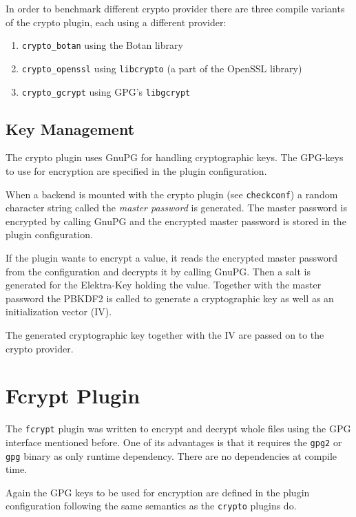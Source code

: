 In order to benchmark different crypto provider there are three compile
variants of the crypto plugin, each using a different provider:

\begin{enumerate}
\def\labelenumi{\arabic{enumi}.}
\tightlist
\item
  \texttt{crypto\_botan} using the Botan library
\item
  \texttt{crypto\_openssl} using \texttt{libcrypto} (a part of the
  OpenSSL library)
\item
  \texttt{crypto\_gcrypt} using GPG's \texttt{libgcrypt}
\end{enumerate}

\subsection{Key Management}\label{key-management}

The crypto plugin uses GnuPG for handling cryptographic keys. The
GPG-keys to use for encryption are specified in the plugin
configuration.

When a backend is mounted with the crypto plugin (see
\texttt{checkconf}) a random character string called the \emph{master
password} is generated. The master password is encrypted by calling
GnuPG and the encrypted master password is stored in the plugin
configuration.

If the plugin wants to encrypt a value, it reads the encrypted master
password from the configuration and decrypts it by calling GnuPG. Then a
salt is generated for the Elektra-Key holding the value. Together with
the master password the PBKDF2 is called to generate a cryptographic key
as well as an initialization vector (IV).

The generated cryptographic key together with the IV are passed on to
the crypto provider.

\section{Fcrypt Plugin}\label{fcrypt-plugin}

The \texttt{fcrypt} plugin was written to encrypt and decrypt whole
files using the GPG interface mentioned before. One of its advantages is
that it requires the \texttt{gpg2} or \texttt{gpg} binary as only
runtime dependency. There are no dependencies at compile time.

Again the GPG keys to be used for encryption are defined in the plugin
configuration following the same semantics as the \texttt{crypto}
plugins do.
